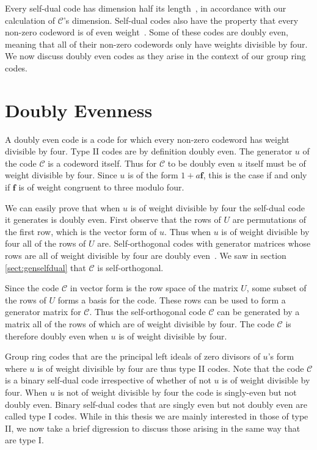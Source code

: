 Every self-dual code has dimension half its length~\cite[p.~6]{huf03}, in accordance with our calculation of $\mathcal{C}$'s dimension.
Self-dual codes also have the property that every non-zero codeword is of even weight~\cite[p.~338]{huf03}.
Some of these codes are doubly even, meaning that all of their non-zero codewords only have weights divisible by four.
We now discuss doubly even codes as they arise in the context of our group ring codes.

\section{Doubly Evenness}
\label{sect:gendoublyeven}
A doubly even code is a code for which every non-zero codeword has weight divisible by four.
Type II codes are by definition doubly even.
The generator $u$ of the code $\mathcal{C}$ is a codeword itself.
Thus for $\mathcal{C}$ to be doubly even $u$ itself must be of weight divisible by four.
Since $u$ is of the form $1 + a\mathbf{f}$, this is the case if and only if $\mathbf{f}$ is of weight congruent to three modulo four.

We can easily prove that when $u$ is of weight divisible by four the self-dual code it generates is doubly even.
First observe that the rows of $U$ are permutations of the first row, which is the vector form of $u$.
Thus when $u$ is of weight divisible by four all of the rows of $U$ are.
Self-orthogonal codes with generator matrices whose rows are all of weight divisible by four are doubly even~\cite[p.~10]{huf03}.
We saw in section \ref{sect:genselfdual} that $\mathcal{C}$ is self-orthogonal.

Since the code $\mathcal{C}$ in vector form is the row space of the matrix $U$, some subset of the rows of $U$ forms a basis for the code.
These rows can be used to form a generator matrix for $\mathcal{C}$.
Thus the self-orthogonal code $\mathcal{C}$ can be generated by a matrix all of the rows of which are of weight divisible by four.
The code $\mathcal{C}$ is therefore doubly even when $u$ is of weight divisible by four.

Group ring codes that are the principal left ideals of zero divisors of $u$'s form where $u$ is of weight divisible by four are thus type II codes.
Note that the code $\mathcal{C}$ is a binary self-dual code irrespective of whether of not $u$ is of weight divisible by four.
When $u$ is not of weight divisible by four the code is singly-even but not doubly even.
Binary self-dual codes that are singly even but not doubly even are called type I codes.
While in this thesis we are mainly interested in those of type II, we now take a brief digression to discuss those arising in the same way that are type I.

